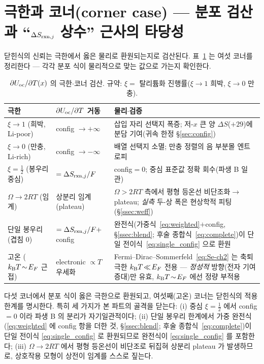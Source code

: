 \section{극한과 코너(corner case) --- 분포 검산과 ``$\Delta S_{\mathrm{rxn},j}$ 상수'' 근사의 타당성}\label{sec:limits}

닫힌식의 신뢰는 극한에서 옳은 물리로 환원되는지로 검산된다. 표~\ref{tab:limits} 는 여섯 코너를 정리한다 ---
각각 분포 식이 물리적으로 맞는 값으로 가는지 확인한다.

\begin{table}[t]
\centering\small
\renewcommand{\arraystretch}{1.35}
\caption{$\partial U_{\mathrm{oc}}/\partial T(x)$ 의 극한$\cdot$코너 검산. 규약: $\xi=$ 탈리튬화 진행률($\xi\to1$ 희박,
$\xi\to0$ 만충).}
\label{tab:limits}
\begin{tabular}{l l p{}}
\toprule
극한 & $\partial U_{\mathrm{oc}}/\partial T$ 거동 & 물리$\cdot$검증 \\
\midrule
$\xi\to1$ (희박, Li-poor) & config $\to+\infty$ & 삽입 자리 선택지 폭증; 저-$x$ 큰 양 $\Delta S$($+29$)에 분담
기여(귀속 한정 \S\ref{sec:config}) \\
$\xi\to0$ (만충, Li-rich) & config $\to-\infty$ & 배열 선택지 소멸; 만충 정렬의 음 부분몰 엔트로피 \\
$\xi=\tfrac12$ (봉우리 중심) & $=\Delta S_{\mathrm{rxn},j}/F$ & config$=0$; 중심 표준값 정확 회수(파생 B 일관) \\
$\Omega\to2RT$ (임계) & 상분리 임계(plateau) & $\Omega>2RT$ 측에서 평형 등온선 비단조화$\to$plateau;
\emph{실측} 두-상 폭은 현상학적 피팅(\S\ref{ssec:weff}) \\
단일 봉우리 (겹침 0) & $=\Delta S_{\mathrm{rxn},j}/F+$ config & 완전식(가중식~\eqref{eq:weighted}$+$config, \S\ref{ssec:blend}; 후술 종합식~\eqref{eq:complete})이 단일 전이식~\eqref{eq:single_config} 으로 환원 \\
고온 ($k_{\mathrm B} T\!\sim\!E_F$ 근접) & electronic $\propto T$ 우세화 & Fermi--Dirac--Sommerfeld~\eqref{eq:Se-ch2} 는
축퇴 극한 $k_{\mathrm B} T\!\ll\!E_F$ 전용 --- \emph{정성적} 방향(전자 기여 증대)만 유효, $k_{\mathrm B} T\!\sim\!E_F$ 에선 정량
부적용 \\
\bottomrule
\end{tabular}
\end{table}

다섯 코너에서 분포 식이 옳은 극한으로 환원되고, 여섯째(고온) 코너는 닫힌식의 적용 한계를 명시한다. 특히
세 가지가 본 파트의 골격을 닫는다: (i) 중심 $\xi=\tfrac12$ 에서 config$=0$ 이라 파생 B 의 분리가 자기일관적이다;
(ii) 단일 봉우리 한계에서 가중 완전식(\eqref{eq:weighted} 에 config 항을 더한 것, \S\ref{ssec:blend}; 후술
종합식~\eqref{eq:complete})이 단일 전이식 \eqref{eq:single_config} 로 환원되므로 완전식이
\eqref{eq:single_config} 를 포함한다; (iii) $\Omega\to2RT$ 에서 평형 등온선이 비단조로 뒤집혀 상분리 plateau 가
발생하므로, 상호작용 모형이 상전이 임계를 스스로 짚는다.

